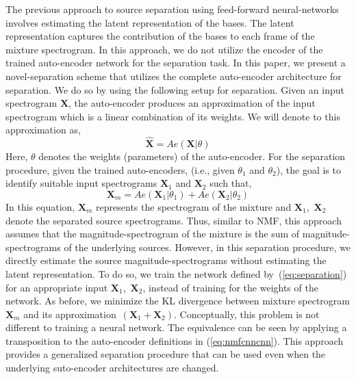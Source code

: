 \documentclass{article}
\begin{document}
The previous approach to source separation using feed-forward neural-networks~\cite{smaragdis2017aneural} involves estimating the latent representation of the bases. The latent representation captures the contribution of the bases to each frame of the mixture spectrogram. In this approach, we do not utilize the encoder of the trained auto-encoder network for the separation task. In this paper, we present a novel-separation scheme that utilizes the complete auto-encoder architecture for separation. We do so by using the following setup for separation. Given an input spectrogram $\mathbf{X}$, the auto-encoder produces an approximation of the input spectrogram which is a linear combination of its weights. We will denote to this approximation as,
\begin{equation}
    \hat{\mathbf{X}} = Ae(\mathbf{X}|\theta)
    \label{eq:separation_ae}
\end{equation}
Here, $\theta$ denotes the weights (parameters) of the auto-encoder. For the separation procedure, given the trained auto-encoders, (i.e., given $\theta_{1}$ and $\theta_{2}$), the goal is to identify suitable input spectrograms $\mathbf{X}_{1}$ and $\mathbf{X}_{2}$ such that,
\begin{equation}
    \mathbf{X}_{m} = Ae(\mathbf{X}_{1}|\theta_{1}) + Ae(\mathbf{X}_{2}|\theta_{2}) 
    \label{eq:separation}
\end{equation}
In this equation, $\mathbf{X}_{m}$ represents the spectrogram of the mixture and $\mathbf{X}_{1}$,~$\mathbf{X}_{2}$ denote the separated source spectrograms. Thus, similar to NMF, this approach assumes that the magnitude-spectrogram of the mixture is the sum of magnitude-spectrograms of the underlying sources. However, in this separation procedure, we directly estimate the source magnitude-spectrograms without estimating the latent representation. To do so, we train the network defined by~(\ref{eq:separation}) for an appropriate input $\mathbf{X}_{1}$,~$\mathbf{X}_{2}$, instead of training for the weights of the network. As before, we minimize the KL divergence between mixture spectrogram $\mathbf{X}_{m}$ and its approximation~$(\mathbf{X}_{1} + \mathbf{X}_{2})$. Conceptually, this problem is not different to training a neural network. The equivalence can be seen by applying a transposition to the auto-encoder definitions in (\ref{eq:nmfcnncnn}). This approach provides a generalized separation procedure that can be used even when the underlying suto-encoder architectures are changed. \\
\end{document}
